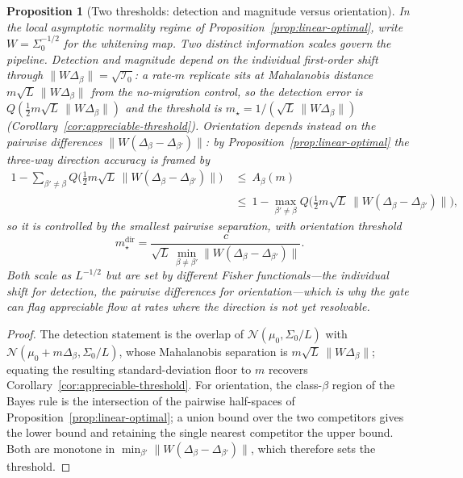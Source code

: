 \documentclass[11pt]{article}
\theoremstyle{plain}
\newtheorem{prop}[thm]{Proposition}
\theoremstyle{definition}
\theoremstyle{remark}
\begin{document}
\begin{prop}[Two thresholds: detection and magnitude versus orientation]\label{prop:two-thresholds}
In the local asymptotic normality regime of Proposition~\ref{prop:linear-optimal}, write
$W=\Sigma_0^{-1/2}$ for the whitening map. Two distinct information scales govern the pipeline.
\emph{Detection and magnitude} depend on the individual first-order shift through
$\lVert W\Delta_\beta\rVert=\sqrt{\mathcal I_0}$: a rate-$m$ replicate sits at Mahalanobis distance
$m\sqrt{L}\,\lVert W\Delta_\beta\rVert$ from the no-migration control, so the detection error is
$Q(\tfrac12 m\sqrt{L}\,\lVert W\Delta_\beta\rVert)$ and the threshold is
$m_\star=1/(\sqrt{L}\,\lVert W\Delta_\beta\rVert)$ (Corollary~\ref{cor:appreciable-threshold}).
\emph{Orientation} depends instead on the pairwise \emph{differences}
$\lVert W(\Delta_\beta-\Delta_{\beta'})\rVert$: by Proposition~\ref{prop:linear-optimal} the
three-way direction accuracy is framed by
\begin{align*}
1-\!\!\sum_{\beta'\neq\beta}\!Q\!\big(\tfrac12 m\sqrt{L}\,
  \lVert W(\Delta_\beta-\Delta_{\beta'})\rVert\big)
&\ \le\ A_\beta(m) \\
&\ \le\ 1-\max_{\beta'\neq\beta}Q\!\big(\tfrac12 m\sqrt{L}\,
  \lVert W(\Delta_\beta-\Delta_{\beta'})\rVert\big),
\end{align*}
so it is controlled by the \emph{smallest} pairwise separation, with orientation threshold
\[
m_\star^{\mathrm{dir}}
=\frac{c}{\sqrt{L}\,\min_{\beta\neq\beta'}
  \lVert W(\Delta_\beta-\Delta_{\beta'})\rVert}.
\]
Both scale as $L^{-1/2}$ but are set by different Fisher functionals---the individual shift for
detection, the pairwise differences for orientation---which is why the gate can flag appreciable
flow at rates where the direction is not yet resolvable.
\end{prop}

\begin{proof}
The detection statement is the overlap of $\mathcal N(\mu_0,\Sigma_0/L)$ with
$\mathcal N(\mu_0+m\Delta_\beta,\Sigma_0/L)$, whose Mahalanobis separation is
$m\sqrt{L}\,\lVert W\Delta_\beta\rVert$; equating the resulting standard-deviation floor to $m$
recovers Corollary~\ref{cor:appreciable-threshold}. For orientation, the class-$\beta$ region of the
Bayes rule is the intersection of the pairwise half-spaces of
Proposition~\ref{prop:linear-optimal}; a union bound over the two competitors gives the lower bound
and retaining the single nearest competitor the upper bound. Both are monotone in
$\min_{\beta'}\lVert W(\Delta_\beta-\Delta_{\beta'})\rVert$, which therefore sets the threshold.
\end{proof}
\end{document}
